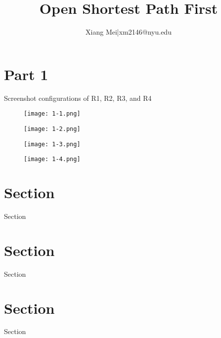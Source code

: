 \documentclass{article}
\author{Xiang Mei|xm2146@nyu.edu}
\title{Open Shortest Path First}
\begin{document}
\maketitle

\section{Part 1}
Screenshot configurations of R1, R2, R3, and R4

\begin{figure}[H]
    \texttt{[image: 1-1.png]}
    \centering
\end{figure}
\begin{figure}[H]
    \texttt{[image: 1-2.png]}
    \centering
\end{figure}
\begin{figure}[H]
    \texttt{[image: 1-3.png]}
    \centering
\end{figure}
\begin{figure}[H]
    \texttt{[image: 1-4.png]}
    \centering
\end{figure}
\section{Section}

Section


\section{Section}

Section

\section{Section}

Section
\end{document}
